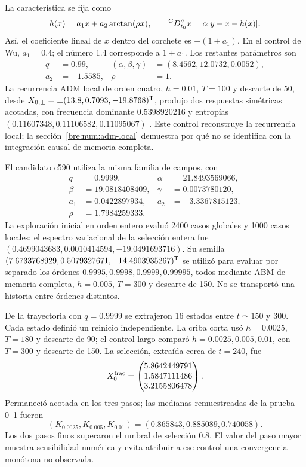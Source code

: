 La característica se fija como
\begin{equation}
 h(x)=a_1x+a_2\arctan(\rho x),\qquad
 {}^{\mathrm C}D_{t_0}^{q}x=\alpha[y-x-h(x)].
 \label{bre:res:arctan-convention}
\end{equation}
Así, el coeficiente lineal de \(x\) dentro del corchete es \(-(1+a_1)\).
En el control de Wu, \(a_1=0.4\); el número 1.4 corresponde a \(1+a_1\).
Los restantes parámetros son
\[
 \begin{aligned}
 q&=0.99,&(\alpha,\beta,\gamma)&=(8.4562,12.0732,0.0052),\\
 a_2&=-1.5585,&\rho&=1.
 \end{aligned}
\]
La recurrencia ADM local de orden cuatro, \(h=0.01\), \(T=100\) y descarte
de 50, desde \(X_{0,\pm}=\pm(13.8,0.7093,-19.8768)^{\mathsf T}\), produjo dos
respuestas simétricas acotadas, con frecuencia dominante \(0.5398920216\)
y entropías \((0.11607348,0.11106582,0.11095067)\)
\cite{Wu2023ArctanChua}. Este control reconstruye la recurrencia local;
la sección~\ref{bre:num:adm-local} demuestra por qué no se identifica con
la integración causal de memoria completa.

El candidato c590 utiliza la misma familia de campos, con
\begin{equation}
 \begin{aligned}
 q&=0.9999,&\alpha&=21.8493569066,\\
 \beta&=19.0818408409,&\gamma&=0.0073780120,\\
 a_1&=0.0422897934,&a_2&=-3.3367815123,\\
 \rho&=1.7984259333.
 \end{aligned}
 \label{bre:res:c590-parameters}
\end{equation}
La exploración inicial en orden entero evaluó 2400 casos globales y 1000
casos locales; el espectro variacional de la selección entera fue
\((0.4699043683,0.0010414594,-19.0491693716)\). Su semilla
\((7.6733768929,0.5079327671,-14.4903935267)^{\mathsf T}\) se utilizó para evaluar
por separado los órdenes \(0.9995,0.9998,0.9999,0.99995\), todos mediante
ABM de memoria completa, \(h=0.005\), \(T=300\) y descarte de 150.
No se transportó una historia entre órdenes distintos.

De la trayectoria con \(q=0.9999\) se extrajeron 16 estados entre
\(t\simeq150\) y 300. Cada estado definió un reinicio independiente. La
criba corta usó \(h=0.0025\), \(T=180\) y descarte de 90; el control largo
comparó \(h=0.0025,0.005,0.01\), con \(T=300\) y descarte de 150.
La selección, extraída cerca de \(t=240\), fue
\begin{equation}
 X_0^{\rm frac}=\begin{pmatrix}
 5.8642449791\\1.5847111486\\3.2155806478
 \end{pmatrix}.
 \label{bre:res:c590-seed}
\end{equation}
Permaneció acotada en los tres pasos; las medianas remuestreadas de la
prueba 0--1 fueron
\[
 (K_{0.0025},K_{0.005},K_{0.01})=(0.865843,0.885089,0.740058).
\]
Los dos pasos finos superaron el umbral de selección 0.8. El valor del paso
mayor muestra sensibilidad numérica y evita atribuir a ese control una
convergencia monótona no observada.

